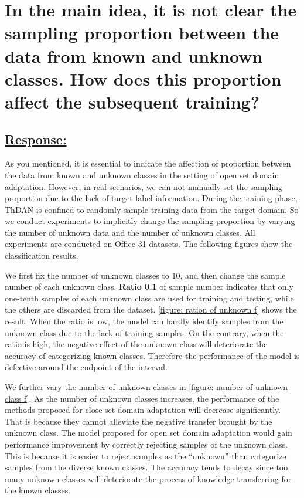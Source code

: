 \renewcommand\thesection{\Roman{section}}

\section{In the main idea, it is not clear the sampling proportion between the data from known and unknown classes. How does this proportion affect the subsequent training?}
\label{Question: class number}
\subsection*{\underline{\textbf{Response:}}}

As you mentioned, it is essential to indicate the affection of proportion between the data from known and unknown classes in the setting of open set domain adaptation.
However, in real scenarios, we can not manually set the sampling proportion due to the lack of target label information.
During the training phase, ThDAN is confined to randomly sample training data from the target domain.
So we conduct experiments to implicitly change the sampling proportion by varying the number of unknown data and the number of unknown classes.
All experiments are conducted on Office-31 datasets.
The following figures show the classification results.



We first fix the number of unknown classes to 10, and then change the sample number of each unknown class.
\textbf{Ratio 0.1} of sample number indicates that only one-tenth samples of each unknown class are used for training and testing, while the others are discarded from the dataset.
\figurename{\ref{figure: ration of unknown f}} shows the result.
When the ratio is low, the model can hardly identify samples from the unknown class due to the lack of training samples.
On the contrary, when the ratio is high, the negative effect of the unknown class will deteriorate the accuracy of categorizing known classes. 
Therefore the performance of the model is defective around the endpoint of the interval.

We further vary the number of unknown classes in \figurename{\ref{figure: number of unknown class f}}.
As the number of unknown classes increases, the performance of the methods proposed for close set domain adaptation will decrease significantly.
That is because they cannot alleviate the negative transfer brought by the unknown class.
The model proposed for open set domain adaptation would gain performance improvement by correctly rejecting samples of the unknown class.
This is because it is easier to reject samples as the ``unknown'' than categorize samples from the diverse known classes.
The accuracy tends to decay since too many unknown classes will deteriorate the process of knowledge transferring for the known classes.

